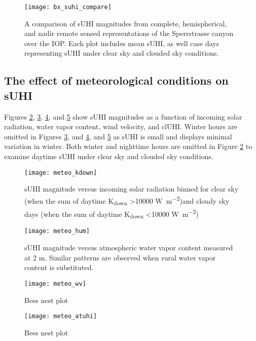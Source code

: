 \begin{figure}[H]
	\centering
	\texttt{[image: bx\_suhi\_compare]}
	\caption{A comparison of sUHI magnitudes from complete, hemispherical, and nadir remote sensed representations of the Sperrstrasse canyon over the IOP. Each plot includes mean sUHI, as well case days representing sUHI under clear sky and clouded sky conditions.}
	\label{bx_suhi_compare}
\end{figure}

\subsection{The effect of meteorological conditions on sUHI}

Figures \ref{meteo_kdown}, \ref{meteo_hum}, \ref{meteo_wv}, and \ref{meteo_atuhi} show sUHI magnitudes as a function of incoming solar radiation, water vapor content, wind velocity, and clUHI. Winter hours are omitted in Figures \ref{meteo_hum}, and \ref{meteo_wv}, and \ref{meteo_atuhi} as sUHI is small and displays minimal variation in winter. Both winter and nighttime hours are omitted in Figure \ref{meteo_kdown} to examine daytime sUHI under clear sky and clouded sky conditions.

\begin{figure}[H]
	\centering
	\texttt{[image: meteo\_kdown]}
	\caption{sUHI magnitude versus incoming solar radiation binned for clear sky (when the sum of daytime K\textsubscript{down} \textgreater 10000 \si{\watt \per \square \meter})and cloudy sky days (when the sum of daytime K\textsubscript{down} \textless 10000 \si{\watt \per \square \meter})}
	\label{meteo_kdown}
\end{figure}

\begin{figure}[H]
	\centering
	\texttt{[image: meteo\_hum]}
	\caption{sUHI magnitude versus atmospheric water vapor content measured at 2 \si{\meter}. Similar patterns are observed when rural water vapor content is substituted.}
	\label{meteo_hum}
\end{figure}

\begin{figure}[H]
	\centering
	\texttt{[image: meteo\_wv]}
	\caption{Bees nest plot}
	\label{meteo_wv}
\end{figure}

\begin{figure}[H]
	\centering
	\texttt{[image: meteo\_atuhi]}
	\caption{Bees nest plot}
	\label{meteo_atuhi}
\end{figure}

